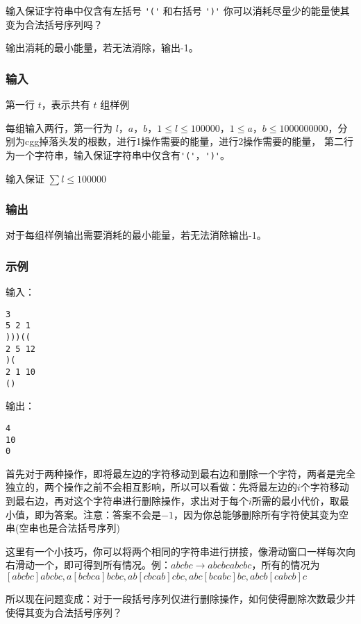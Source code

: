 输入保证字符串中仅含有左括号 \verb|'('| 和右括号 \verb|')'|
你可以消耗尽量少的能量使其变为合法括号序列吗？

输出消耗的最小能量，若无法消除，输出-1。

\subsubsection{输入}
第一行 $t$，表示共有 $t$ 组样例

每组输入两行，第一行为 $l$，$a$，$b$，$1 \leq l \leq 100000$，$1 \leq a$，$b \leq
1000000000$，分别为cgg掉落头发的根数，进行1操作需要的能量，进行2操作需要的能量，
第二行为一个字符串，输入保证字符串中仅含有\verb|'('|，\verb|')'|。

输入保证 $\sum l \leq 100000$

\subsubsection{输出}
对于每组样例输出需要消耗的最小能量，若无法消除输出-1。

\subsubsection{示例}
输入：
\begin{lstlisting}
3
5 2 1
)))((
2 5 12
)(
2 1 10
()
\end{lstlisting}

输出：
\begin{lstlisting}
4
10
0
\end{lstlisting}

首先对于两种操作，即将最左边的字符移动到最右边和删除一个字符，两者是完全独立的，两个操作之前不会相互影响，所以可以看做：先将最左边的$i$个字符移动到最右边，再对这个字符串进行删除操作，求出对于每个$i$所需的最小代价，取最小值，即为答案。注意：答案不会是$-1$，因为你总能够删除所有字符使其变为空串(空串也是合法括号序列)

这里有一个小技巧，你可以将两个相同的字符串进行拼接，像滑动窗口一样每次向右滑动一个，即可得到所有情况。例：$abcbc \rightarrow abcbcabcbc$，所有的情况为$[abcbc]abcbc,a[bcbca]bcbc,ab[cbcab]cbc,abc[bcabc]bc,abcb[cabcb]c$

所以现在问题变成：对于一段括号序列仅进行删除操作，如何使得删除次数最少并使得其变为合法括号序列？

